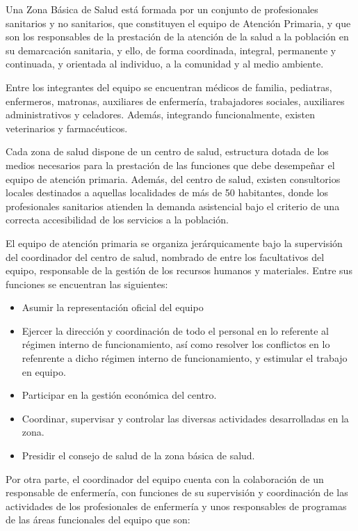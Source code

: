 Una Zona Básica de Salud está formada por un conjunto de profesionales sanitarios y no sanitarios, que constituyen el equipo de Atención Primaria, y que son los responsables de la prestación de la atención de la salud a la población en su demarcación sanitaria, y ello, de forma coordinada, integral, permanente y continuada, y orientada al individuo, a la comunidad y al medio ambiente.

Entre los integrantes del equipo se encuentran médicos de familia, pediatras, enfermeros, matronas, auxiliares de enfermería, trabajadores sociales, auxiliares administrativos y celadores. Además, integrando funcionalmente, existen veterinarios y farmacéuticos.

Cada zona de salud dispone de un centro de salud, estructura dotada de los medios necesarios para la prestación de las funciones que debe desempeñar el equipo de atención primaria. Además, del centro de salud, existen consultorios locales destinados a aquellas localidades de más de 50 habitantes, donde los profesionales sanitarios atienden la demanda asistencial bajo el criterio de una correcta accesibilidad de los servicios a la población.

El equipo de atención primaria se organiza jerárquicamente bajo la supervisión del coordinador del centro de salud, nombrado de entre los facultativos del equipo, responsable de la gestión de los recursos humanos y materiales. Entre sus funciones se encuentran las siguientes:

\begin{itemize}
    \item Asumir la representación oficial del equipo
    \item Ejercer la dirección y coordinación de todo el personal en lo referente al régimen interno de funcionamiento, así como resolver los conflictos en lo refenrente a dicho régimen interno de funcionamiento, y estimular el trabajo en equipo.
    \item Participar en la gestión económica del centro.
    \item Coordinar, supervisar y controlar las diversas actividades desarrolladas en la zona.
    \item Presidir el consejo de salud de la zona básica de salud.
\end{itemize}

Por otra parte, el coordinador del equipo cuenta con la colaboración de un responsable de enfermería, con funciones de su supervisión y coordinación de las actividades de los profesionales de enfermería y unos responsables de programas de las áreas funcionales del equipo que son:

